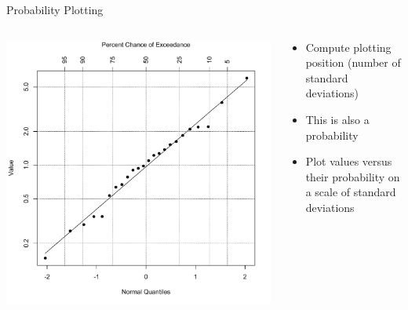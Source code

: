 \documentclass{beamer}
\begin{document}
\begin{frame}{Probability Plotting}

\begin{columns}    
	\begin{column}{4cm}        
		\begin{center}		           
	 	\includegraphics[width=1.0\textwidth]{Figure7}        
		\end{center}   
	 \end{column}    
	\begin{column}{5cm}        
	\begin{itemize}
	\item Compute plotting position (number of standard deviations)
	\item This is also a probability
	\item Plot values versus their probability on a scale of standard deviations
	\end{itemize}
	\end{column}
	\end{columns}

\end{frame}
\end{document}
